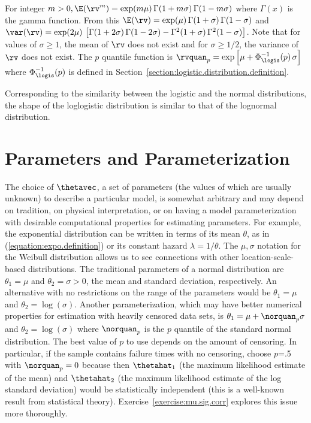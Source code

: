 For integer $m>0, \E(\rv^{m})= \exp( m \mu) \,
\Gamma(1+m \sigma)\, \Gamma(1- m \sigma)$
where $\Gamma(x)$ is the gamma function. 
From this $\E(\rv) = \exp( \mu) \, \Gamma(1+\sigma) \,
\Gamma(1-\sigma)$ and $\var(\rv)= \exp( 2 \mu) \, 	\left [
\Gamma(1+2\sigma) \, \Gamma(1-2\sigma) -\Gamma^{2}(1+\sigma) \,
\Gamma^{2}(1-\sigma)\right ]$. 
Note that for values of $\sigma \geq 1$, the mean of
$\rv$ does not exist and for $\sigma \geq 1/2$, the variance of $\rv$
does not exist. The $p$ quantile function is
$\rvquan_{p}=\exp \left [\mu +
\Phi^{-1}_{\logis}(p)\, \sigma \right]$
where $\Phi^{-1}_{\logis}(p)$ is defined in
Section~\ref{section:logistic.distribution.definition}.

Corresponding to the similarity between the logistic and the normal
distributions, the shape of the loglogistic distribution is similar to
that of the lognormal distribution.


\section{Parameters and Parameterization}
\label{section:parameterization.choice}
The choice of $\thetavec$, a set of parameters (the values of which
are usually unknown) to describe a particular model, is
somewhat arbitrary and may depend on tradition, on physical
interpretation, or on having a model parameterization with desirable
computational properties for estimating parameters.  For example, the
exponential distribution can be written in terms of its mean $\theta$,
as in (\ref{equation:expo.definition}) 
or its constant hazard $\lambda=1/\theta$.
The $\mu,\sigma$ notation for the Weibull distribution allows us to
see connections with other location-scale-based distributions.
The traditional parameters of a normal distribution are
$\theta_{1}=\mu$ and $\theta_{2}=\sigma>0$, the mean and standard
deviation, respectively. An alternative with no restrictions on the
range of the parameters would be $\theta_{1}=\mu$ and
$\theta_{2}=\log(\sigma)$.  Another parameterization, which may have
better numerical properties for estimation with heavily censored data sets, is
$\theta_{1}=\mu+\norquan_{p}\sigma$ and $\theta_{2}=\log(\sigma)$
where $\norquan_{p}$ is the $p$ quantile of the standard normal
distribution.  The best value of $p$ to use depends on the amount
of censoring. In particular, if the sample contains
failure times with no censoring, 
choose $p$=.5 with $\norquan_{p}=0$ because then
$\thetahat_{1}$ (the maximum likelihood estimate of the mean) and
$\thetahat_{2}$ (the maximum likelihood estimate of the log standard
deviation) would be statistically independent (this is a well-known
result from statistical theory). 
Exercise~\ref{exercise:mu.sig.corr} explores this
issue more thoroughly.



